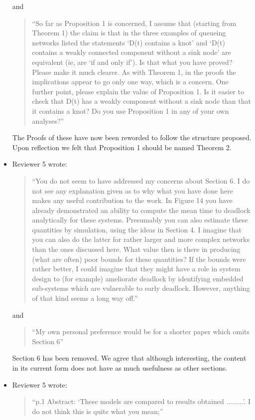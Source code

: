 \documentclass{article}
\begin{document}
\begin{itemize}
and

\begin{quote}
``So far as Proposition 1 is concerned, I assume that (starting from Theorem 1) the claim is that in the three examples of queueing networks listed the statements ‘D(t) contains a knot’ and ‘D(t) contains a weakly connected component without a sink node’ are equivalent (ie, are ‘if and only if’). Is that what you have proved? Please make it much clearer. As with Theorem 1, in the proofs the implications appear to go only one way, which is a concern. One further point, please explain the value of Proposition 1. Is it easier to check that D(t) has a weakly component without a sink node than that it contains a knot? Do you use Proposition 1 in any of your own analyses?''
\end{quote}

The Proofs of these have now been reworded to follow the structure proposed. Upon reflection we felt that Proposition 1 should be named Theorem 2.


\item Reviewer 5 wrote:
\begin{quote}
``You do not seem to have addressed my concerns about Section 6. I do not see any explanation given as to why what you have done here makes any useful contribution to the work. In Figure 14 you have already demonstrated an ability to compute the mean time to deadlock analytically for these systems. Presumably you can also estimate these quantities by simulation, using the ideas in Section 4. I imagine that you can also do the latter for rather larger and more complex networks than the ones discussed here. What value then is there in producing (what are often) poor bounds for these quantities? If the bounds were rather better, I could imagine that
they might have a role in system design to (for example) ameliorate deadlock by identifying embedded sub-systems which are vulnerable to early deadlock. However, anything of that kind seems a long way off.''
\end{quote}

and

\begin{quote}
``My own personal preference would be for a shorter paper which omits Section 6''
\end{quote}

Section 6 has been removed. We agree that although interesting, the content in its current form does not have as much usefulness as other sections.


\item Reviewer 5 wrote:
\begin{quote}
``p.1 Abstract: ‘These models are compared to results obtained .........’. I do not think this is quite what you mean;''
\end{quote}


\end{itemize}
\end{document}
